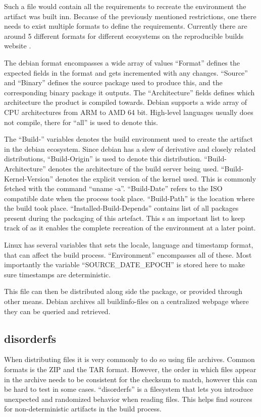 \documentclass[../Main/thesis.tex]{subfiles}
\begin{document}
Such a file would contain all the requirements to recreate the environment the
artifact was built inn. Because of the previously mentioned restrictions, one
there needs to exist multiple formats to define the requirements. Currently
there are around 5 different formats for different ecosystems on the
reproducible builds website \cite{reproducible-builds-2019}.


The debian format encompasses a wide array of values ``Format'' defines
the expected fields in the format and gets incremented with any changes.
``Source'' and ``Binary'' defines the source package used to produce this, and
the corresponding binary package it outputs. The ``Architecture'' fields defines
which architecture the product is compiled towards. Debian supports a wide array
of CPU architectures from ARM to AMD 64 bit. High-level languages usually does
not compile, there for ``all'' is used to denote this.

The ``Build-'' variables denotes the build environment used to create the
artifact in the debian ecosystem. Since debian has a slew of derivative and
closely related distributions, ``Build-Origin'' is used to denote this
distribution.  ``Build-Architecture'' denotes the architecture of the build
server being used.  ``Build-Kernel-Version'' denotes the explicit  version of
the kernel used. This is commonly fetched with the command ``uname -a''.
``Build-Date'' refers to the ISO compatible date when the process took place.
``Build-Path'' is the location where the build took place.
``Installed-Build-Depends'' contains list of all packages present during the
packaging of this artefact. This s an important list to keep track of as it
enables the complete recreation of the environment at a later point.

Linux has several variables that sets the locale, language and timestamp format,
that can affect the build process. ``Environment'' encompasses all of these.
Most importantly the variable ``SOURCE\_DATE\_EPOCH'' is stored here to make sure
timestamps are deterministic.

This file can then be distributed along side the package, or provided through
other means. Debian archives all buildinfo-files on a centralized webpage where
they can be queried and retrieved.


\subsection*{disorderfs}
When distributing files it is very commonly to do so using file archives. Common
formats is the ZIP and the TAR format. However, the order in which files appear
in the archive needs to be consistent for the checksum to match, however this
can be hard to test in some cases. ``disorderfs'' is a filesystem that lets you
introduce unexpected and randomized behavior when reading files. This helps find
sources for non-deterministic artifacts in the build process.
\end{document}
